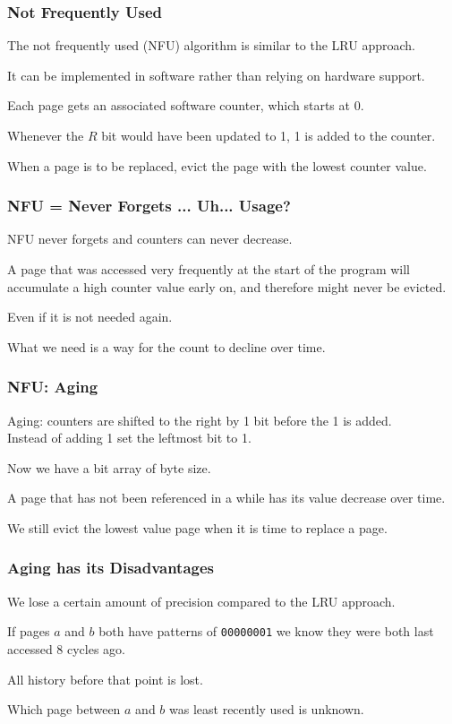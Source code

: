 \begin{frame}
\frametitle{Not Frequently Used}

The not frequently used (NFU) algorithm is similar to the LRU approach.

It can be implemented in software rather than relying on hardware support.

Each page gets an associated software counter, which starts at 0. 

Whenever the $R$ bit would have been updated to 1, 1 is added to the counter. 

When a page is to be replaced, evict the page with the lowest counter value.

\end{frame}

\begin{frame}
\frametitle{NFU = Never Forgets ... Uh... Usage?}

NFU never forgets and counters can never decrease. 

A page that was accessed very frequently at the start of the program will accumulate a high counter value early on, and therefore might never be evicted.

Even if it is not needed again. 

What we need is a way for the count to decline over time. 



\end{frame}

\begin{frame}
\frametitle{NFU: Aging}

\alert{Aging}: counters are shifted to the right by 1 bit before the 1 is added.\\
\quad Instead of adding 1 set the leftmost bit to 1. 

Now we have a bit array of byte size.

A page that has not been referenced in a while has its value decrease over time. 

We still evict the lowest value page when it is time to replace a page.

\end{frame}

\begin{frame}
\frametitle{Aging has its Disadvantages}

We lose a certain amount of precision compared to the LRU approach.

If pages $a$ and $b$ both have patterns of \texttt{00000001} we know they were both last accessed 8 cycles ago. 

All history before that point is lost. 

Which page between $a$ and $b$ was least recently used is unknown.


\end{frame}

